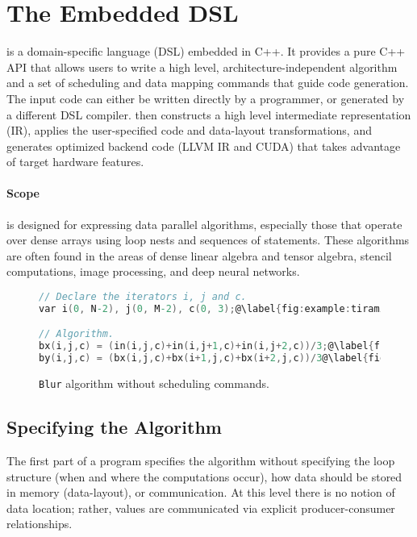 \vspace{-0.25cm}
\section{The \framework Embedded DSL}

\framework{} is a domain-specific language (DSL) embedded in C++. It provides a pure C++ API that allows users to write a high level, architecture-independent algorithm and a set of scheduling and data mapping commands that guide code generation.
The input \framework code can either be written directly by a programmer, or generated by a different DSL compiler.  \framework{} then constructs a high level intermediate representation (IR), applies the user-specified code and data-layout transformations, and generates optimized backend code (LLVM IR and CUDA) that takes advantage of target hardware features.


\vspace{-0.25cm}
\paragraph{\textbf{Scope}}
\framework is designed for expressing data parallel algorithms, especially those that operate over dense arrays using loop nests and sequences of statements.  These algorithms are often found in the areas of dense linear algebra and tensor algebra, stencil computations, image processing, and deep neural networks.

\begin{figure}[!t]
\begin{lstlisting}[language=C,escapechar=@]
// Declare the iterators i, j and c.
var i(0, N-2), j(0, M-2), c(0, 3);@\label{fig:example:tiramisu:iterators}@

// Algorithm.
bx(i,j,c) = (in(i,j,c)+in(i,j+1,c)+in(i,j+2,c))/3;@\label{fig:example:tiramisu:computation1}@
by(i,j,c) = (bx(i,j,c)+bx(i+1,j,c)+bx(i+2,j,c))/3@\label{fig:example:tiramisu:computation2}@);
\end{lstlisting}
\vspace{-0.25cm}
\caption{\label{fig:algorithm}\texttt{Blur} algorithm without scheduling commands.}
\vspace{-0.25cm}
\end{figure}

\vspace{-0.3cm}
\subsection{Specifying the Algorithm}
The first part of a \framework{} program specifies the algorithm without specifying the loop structure (when and where the computations occur), how data should be stored in memory (data-layout), or communication.
At this level there is no notion of data location; rather, values are communicated via explicit producer-consumer relationships.

